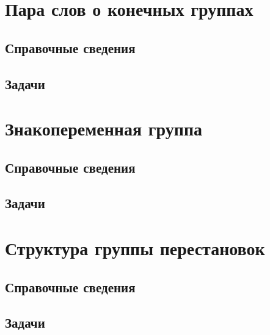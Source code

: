 \section{Пара слов о конечных группах}

\subsection*{Справочные сведения}

\subsection*{Задачи}



\section{Знакопеременная группа}

\subsection*{Справочные сведения}

\subsection*{Задачи}




\section{Структура группы перестановок}

\subsection*{Справочные сведения}

\subsection*{Задачи}

